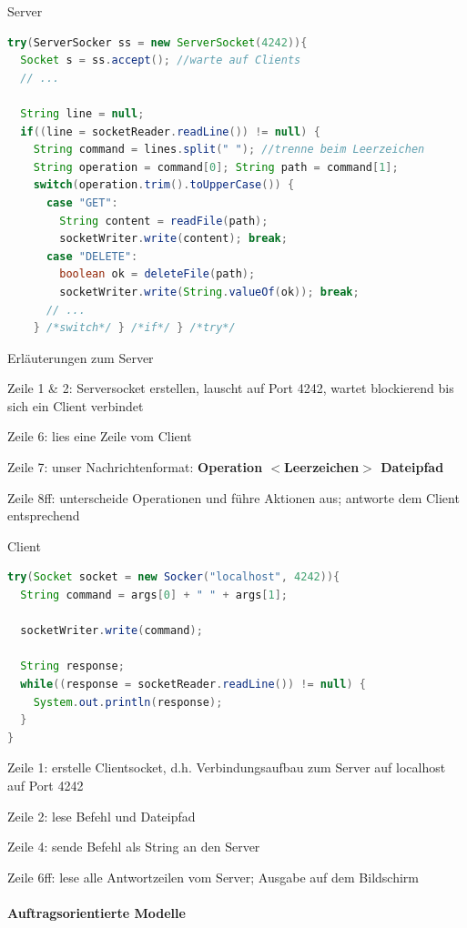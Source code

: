 \documentclass[10pt]{article}
\begin{document}
  Server
  \begin{lstlisting}[language=java]
try(ServerSocker ss = new ServerSocket(4242)){
  Socket s = ss.accept(); //warte auf Clients
  // ...

  String line = null;
  if((line = socketReader.readLine()) != null) {
    String command = lines.split(" "); //trenne beim Leerzeichen
    String operation = command[0]; String path = command[1];
    switch(operation.trim().toUpperCase()) {
      case "GET":
        String content = readFile(path);
        socketWriter.write(content); break;
      case "DELETE":
        boolean ok = deleteFile(path);
        socketWriter.write(String.valueOf(ok)); break;
      // ...
    } /*switch*/ } /*if*/ } /*try*/
\end{lstlisting}
  Erläuterungen zum Server
  \begin{itemize*}
    \item Zeile 1 \& 2: Serversocket erstellen, lauscht auf Port 4242, wartet blockierend bis sich ein Client verbindet
    \item Zeile 6: lies eine Zeile vom Client
    \item Zeile 7: unser Nachrichtenformat: \textbf{Operation $<$Leerzeichen$>$ Dateipfad}
    \item Zeile 8ff: unterscheide Operationen und führe Aktionen aus; antworte dem Client entsprechend
  \end{itemize*}
  
  Client
  \begin{lstlisting}[language=java]
try(Socket socket = new Socker("localhost", 4242)){
  String command = args[0] + " " + args[1];

  socketWriter.write(command);

  String response;
  while((response = socketReader.readLine()) != null) {
    System.out.println(response);
  }
}
\end{lstlisting}
  \begin{itemize*}
    \item Zeile 1: erstelle Clientsocket, d.h. Verbindungsaufbau zum Server auf localhost auf Port 4242
    \item Zeile 2: lese Befehl und Dateipfad
    \item Zeile 4: sende Befehl als String an den Server
    \item Zeile 6ff: lese alle Antwortzeilen vom Server; Ausgabe auf dem Bildschirm
  \end{itemize*}
  
  \paragraph{Auftragsorientierte Modelle}
  
\end{document}
